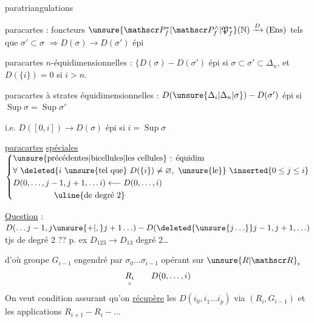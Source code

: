 
 paratriangulations

paracartes : foncteurs $\unsure{\mathscr P_f^*|\mathscr P_f^\wedge|\mathfrak P_f^*}(\mathbb N)\xrightarrow{D}(\mathrm{Ens})$ tels que $\sigma'\subset\sigma$  $\Rightarrow D(\sigma)\to D(\sigma')$ épi

paracartes $n$-équidimensionnelles : $\big\{D(\sigma)\mathbin{-}D(\sigma')$  épi si  $\sigma\subset\sigma'\subset\Delta_n$, et $D(\{i\})=0$ si $i>n$.

paracartes à  strates équidimensionnelles : $D(\unsure{\Delta_i|\Delta_n|\sigma})\mathbin{-}D(\sigma')$ épi si $\operatorname{Sup}\sigma=\operatorname{Sup}\sigma'$

i.e. $D([0,i])\to D(\sigma)$ épi si $i=\operatorname{Sup}\sigma$

\uline{paracartes} \uline{spéciales} \quad $\left\{\begin{aligned}
 &\text{\unsure{précédentes|bicellules|les cellules} : équidim}\\
 &\forall\ \deleted{i\ \text{\unsure{tel que}}\ D(\{i\})\ne\varnothing,\ \text{\unsure{le}}}\ \inserted{0\leq j\leq i}\\
 &D(0,\ldots,j-1,j+1,\ldots i)\longleftarrow D(0,\ldots,i)\\
 &\hspace{5em}\text{\uline{de degré 2}}
 \end{aligned}\right.$


\uline{Question} :  $D(\ldots j-1,j\unsure{+|,}j+1\ldots)\mathbin{-}D(\deleted{\unsure{j\ldots}}j-1,j+1,\ldots)$ tjs de degré 2 ?? p. ex $D_{123}\to D_{13}$ degré 2\ldots

d'où groupe $G_{i-1}$ engendré par $\sigma_0\ldots\sigma_{i-1}$ opérant sur $\unsure{R|\mathscr R}_i$
\[
 \underset{\shortparallel}{R_i}\qquad D(0,\ldots,i)
\]
On veut condition assurant qu'on \uline{récupère} les  $D(i_0,i_1\ldots i_p)$  via $(R_i,G_{i-1})$ et les applications $R_{i+1}\mathbin{-}R_i\mathbin{-}\ldots$

